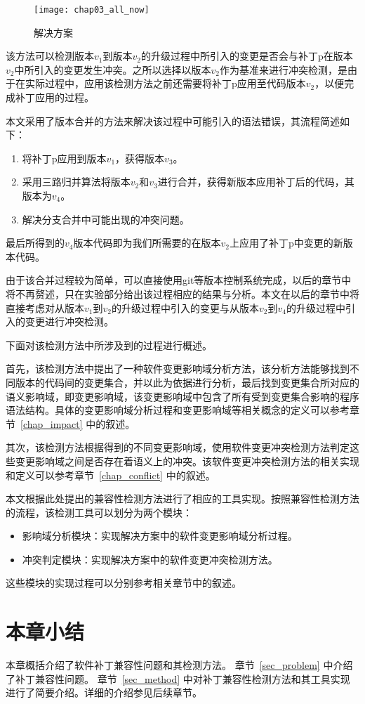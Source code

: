 \begin{figure}[H]
	\centering
	\texttt{[image: chap03\_all\_now]}
	\caption {解决方案}
	\label {all_flow}	
\end{figure}

该方法可以检测版本$v_1$到版本$v_2$的升级过程中所引入的变更是否会与补丁p在版本$v_2$中所引入的变更发生冲突。之所以选择以版本$v_2$作为基准来进行冲突检测，是由于在实际过程中，应用该检测方法之前还需要将补丁p应用至代码版本$v_2$，以便完成补丁应用的过程。

本文采用了版本合并的方法来解决该过程中可能引入的语法错误，其流程简述如下：
\begin{enumerate}
	\item 将补丁p应用到版本$v_1$，获得版本$v_3$。
	\item 采用三路归并算法将版本$v_2$和$v_3$进行合并，获得新版本应用补丁后的代码，其版本为$v_4$。
	\item 解决分支合并中可能出现的冲突问题。
\end{enumerate}

最后所得到的$v_4$版本代码即为我们所需要的在版本$v_2$上应用了补丁p中变更的新版本代码。

由于该合并过程较为简单，可以直接使用git等版本控制系统完成，以后的章节中将不再赘述，只在实验部分给出该过程相应的结果与分析。本文在以后的章节中将直接考虑对从版本$v_1$到$v_2$的升级过程中引入的变更与从版本$v_2$到$v_4$的升级过程中引入的变更进行冲突检测。

下面对该检测方法中所涉及到的过程进行概述。

首先，该检测方法中提出了一种软件变更影响域分析方法，该分析方法能够找到不同版本的代码间的变更集合，并以此为依据进行分析，最后找到变更集合所对应的语义影响域，即变更影响域，该变更影响域中包含了所有受到变更集合影响的程序语法结构。具体的变更影响域分析过程和变更影响域等相关概念的定义可以参考章节~\ref{chap_impact} 中的叙述。

其次，该检测方法根据得到的不同变更影响域，使用软件变更冲突检测方法判定这些变更影响域之间是否存在着语义上的冲突。该软件变更冲突检测方法的相关实现和定义可以参考章节~\ref{chap_conflict} 中的叙述。

本文根据此处提出的兼容性检测方法进行了相应的工具实现。按照兼容性检测方法的流程，该检测工具可以划分为两个模块：
\begin{itemize}
	\item 影响域分析模块：实现解决方案中的软件变更影响域分析过程。
	\item 冲突判定模块：实现解决方案中的软件变更冲突检测方法。
\end{itemize}

这些模块的实现过程可以分别参考相关章节中的叙述。

\section{本章小结}
本章概括介绍了软件补丁兼容性问题和其检测方法。
章节~\ref{sec_problem} 中介绍了补丁兼容性问题。
章节~\ref{sec_method} 中对补丁兼容性检测方法和其工具实现进行了简要介绍。详细的介绍参见后续章节。


